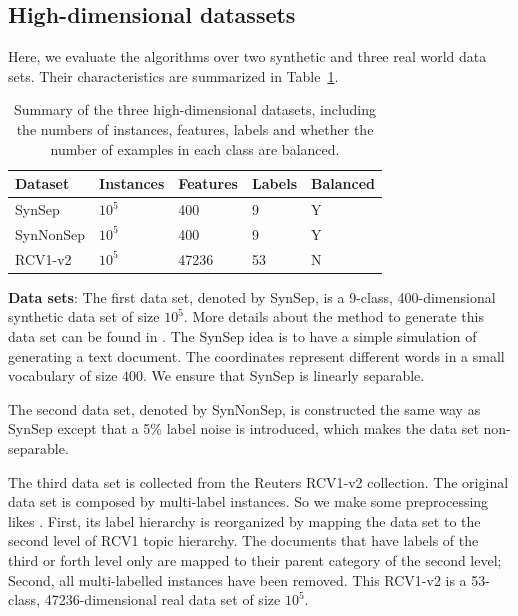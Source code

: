 \documentclass[preprint,12pt,authoryear]{elsarticle}
\begin{document}
\subsection{High-dimensional datassets}
\label{subsec:BPAE}
Here, we evaluate the algorithms over two synthetic and three real world data sets. Their characteristics are summarized in Table~\ref{table:mce}.

\begin{table}[h]
	\caption{Summary of the three high-dimensional datasets, including the numbers of instances, features, labels and whether the number of examples in each class are balanced.}
	\label{table:mce}
	\begin{center}
		\begin{tabular}{l l l l l}
			{\bf Dataset}  & {\bf Instances} & {\bf Features} & {\bf Labels}& {\bf Balanced}\\
			\hline
			SynSep & $10^5$ 	& 400 	& 9 & Y\\
			
			SynNonSep & $10^5$ & 400 	& 9 & Y\\
			
			RCV1-v2  & $10^5$ 	& 47236 	& 53 & N\\
			
			
		\end{tabular}
	\end{center}
\end{table}

\textbf{Data sets}:
The first data set, denoted by SynSep,  is a 9-class, 400-dimensional synthetic data set of size $10^5$. More details about the method to generate this data set can be found in \cite{kakade2008efficient}. The SynSep  idea is to have a simple simulation of generating a text document. The coordinates represent different words in a small vocabulary of size $400$. We ensure that SynSep is linearly separable. 

The second data set, denoted by SynNonSep, is constructed  the same way as  SynSep except that a 5\% label noise is introduced, which makes the data set non-separable. 

The third data set is collected from the Reuters RCV1-v2 collection\cite{David04RCV}. The original data set is composed by multi-label instances. So we make some preprocessing likes \cite{RB08a}. First, its label hierarchy is reorganized by mapping the data set to the second level of RCV1 topic hierarchy. The documents that have labels of the third or forth level only are mapped to their parent category of the second level; Second, all multi-labelled instances have been removed. This RCV1-v2 is a 53-class,  47236-dimensional real data set of size $10^5$. 
\end{document}
